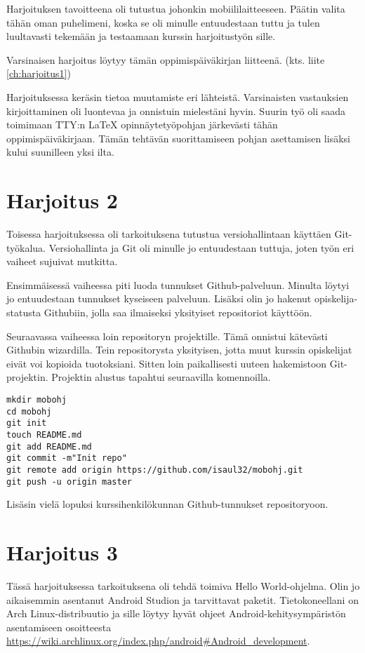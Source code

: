 \documentclass[globalnumbering,centeredcaptions]{tutthesis/tutthesis} %
\begin{document}
Harjoituksen tavoitteena oli tutustua johonkin mobiililaitteeseen. Päätin valita tähän oman puhelimeni, koska se oli minulle entuudestaan tuttu ja tulen luultavasti tekemään ja testaamaan kurssin harjoitustyön sille.

Varsinaisen harjoitus löytyy tämän oppimispäiväkirjan liitteenä. (kts. liite \ref{ch:harjoitus1})

Harjoituksessa keräsin tietoa muutamiste eri lähteistä. Varsinaisten vastauksien kirjoittaminen oli luontevaa ja onnistuin mielestäni hyvin. Suurin työ oli saada toimimaan TTY:n LaTeX opinnäytetyöpohjan järkevästi tähän oppimispäiväkirjaan. Tämän tehtävän suorittamiseen pohjan asettamisen lisäksi kului suunilleen yksi ilta.

\section{Harjoitus 2}

Toisessa harjoituksessa oli tarkoituksena tutustua versiohallintaan käyttäen Git-työkalua. Versiohallinta ja Git oli minulle jo entuudestaan tuttuja, joten työn eri vaiheet sujuivat mutkitta.

Ensimmäisessä vaiheessa piti luoda tunnukset Github-palveluun. Minulta löytyi jo entuudestaan tunnukset kyseiseen palveluun. Lisäksi olin jo hakenut opiskelija-statusta Githubiin, jolla saa ilmaiseksi yksityiset repositoriot käyttöön.

Seuraavassa vaiheessa loin repositoryn projektille. Tämä onnistui kätevästi Githubin wizardilla. Tein repositorysta yksityisen, jotta muut kurssin opiskelijat eivät voi kopioida tuotoksiani. Sitten loin paikallisesti uuteen hakemistoon Git-projektin. Projektin alustus tapahtui seuraavilla komennoilla.

\begin{lstlisting}
mkdir mobohj
cd mobohj
git init
touch README.md
git add README.md
git commit -m"Init repo"
git remote add origin https://github.com/isaul32/mobohj.git
git push -u origin master
\end{lstlisting}

Lisäsin vielä lopuksi kurssihenkilökunnan Github-tunnukset repositoryoon.

\section{Harjoitus 3}

Tässä harjoituksessa tarkoituksena oli tehdä toimiva Hello World-ohjelma. Olin jo aikaisemmin asentanut Android Studion ja tarvittavat paketit. Tietokoneellani on Arch Linux-distribuutio ja sille löytyy hyvät ohjeet Android-kehitysympäristön asentamiseen osoitteesta \url{https://wiki.archlinux.org/index.php/android#Android_development}.
\end{document}
